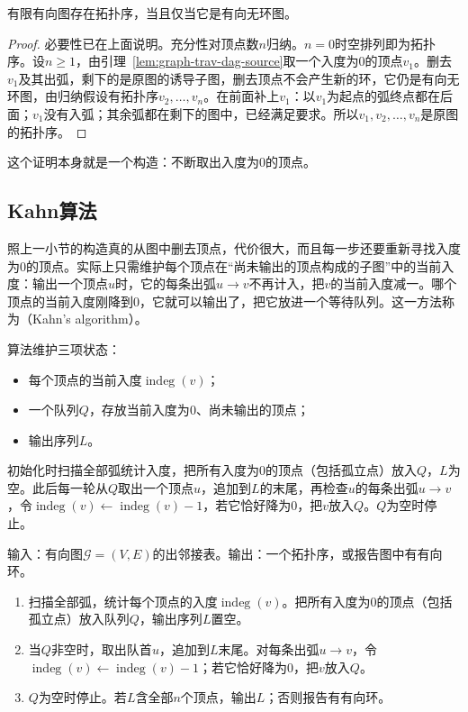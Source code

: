 \begin{theorem}[拓扑序的存在性]
\label{thm:graph-trav-topological-existence}
有限有向图存在拓扑序，当且仅当它是有向无环图。
\end{theorem}

\begin{proof}
必要性已在上面说明。充分性对顶点数$n$归纳。$n=0$时空排列即为拓扑序。设$n\geq1$，由引理~\ref{lem:graph-trav-dag-source}取一个入度为$0$的顶点$v_1$。删去$v_1$及其出弧，剩下的是原图的诱导子图，删去顶点不会产生新的环，它仍是有向无环图，由归纳假设有拓扑序$v_2,\ldots,v_n$。在前面补上$v_1$：以$v_1$为起点的弧终点都在后面；$v_1$没有入弧；其余弧都在剩下的图中，已经满足要求。所以$v_1,v_2,\ldots,v_n$是原图的拓扑序。
\end{proof}

这个证明本身就是一个构造：不断取出入度为$0$的顶点。

\subsection{Kahn算法}
\label{sec:graph-trav-kahn}

照上一小节的构造真的从图中删去顶点，代价很大，而且每一步还要重新寻找入度为$0$的顶点。实际上只需维护每个顶点在“尚未输出的顶点构成的子图”中的当前入度：输出一个顶点$u$时，它的每条出弧$u\to v$不再计入，把$v$的当前入度减一。哪个顶点的当前入度刚降到$0$，它就可以输出了，把它放进一个等待队列。这一方法称为（Kahn's algorithm）。

算法维护三项状态：
\begin{itemize}
  \item 每个顶点的当前入度$\operatorname{indeg}(v)$；
  \item 一个队列$Q$，存放当前入度为$0$、尚未输出的顶点；
  \item 输出序列$L$。
\end{itemize}
初始化时扫描全部弧统计入度，把所有入度为$0$的顶点（包括孤立点）放入$Q$，$L$为空。此后每一轮从$Q$取出一个顶点$u$，追加到$L$的末尾，再检查$u$的每条出弧$u\to v$，令$\operatorname{indeg}(v)\gets\operatorname{indeg}(v)-1$，若它恰好降为$0$，把$v$放入$Q$。$Q$为空时停止。

\begin{algorithm}[Kahn拓扑排序]
\label{alg:graph-trav-kahn}
输入：有向图$\mathcal G=(V,E)$的出邻接表。输出：一个拓扑序，或报告图中有有向环。
\begin{enumerate}
  \item 扫描全部弧，统计每个顶点的入度$\operatorname{indeg}(v)$。把所有入度为$0$的顶点（包括孤立点）放入队列$Q$，输出序列$L$置空。
  \item 当$Q$非空时，取出队首$u$，追加到$L$末尾。对每条出弧$u\to v$，令$\operatorname{indeg}(v)\gets\operatorname{indeg}(v)-1$；若它恰好降为$0$，把$v$放入$Q$。
  \item $Q$为空时停止。若$L$含全部$n$个顶点，输出$L$；否则报告有有向环。
\end{enumerate}
\end{algorithm}

